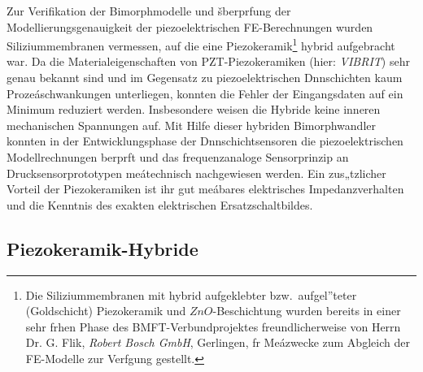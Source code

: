 Zur Verifikation der Bimorphmodelle und šberprfung der
Modellierungsgenauigkeit der piezoelektrischen FE-Berechnungen wurden
Siliziummembranen vermessen, auf die eine
Piezokeramik\footnote{Die Siliziummembranen mit hybrid aufgeklebter
bzw.\ aufgel”teter (Goldschicht) Piezokeramik und
$ZnO$-Beschichtung wurden bereits in einer sehr frhen
Phase des BMFT-Verbundprojektes freundlicherweise von Herrn Dr. G. Flik,
{\sl Robert Bosch GmbH}, Gerlingen, fr Meázwecke zum Abgleich der
FE-Modelle zur Verfgung gestellt.} hybrid aufgebracht war. Da die
Materialeigenschaften von PZT-Piezokeramiken (hier: {\sl VIBRIT}) sehr
genau bekannt sind und im Gegensatz zu piezoelektrischen Dnnschichten
kaum Prozeáschwankungen unterliegen, konnten die Fehler der
Eingangsdaten auf ein Minimum reduziert werden. Insbesondere weisen die
Hybride keine inneren mechanischen Spannungen auf. Mit Hilfe dieser
hybriden Bimorphwandler konnten in der Entwicklungsphase der
Dnnschichtsensoren die piezoelektrischen Modellrechnungen berprft und
das frequenzanaloge Sensorprinzip an Drucksensorprototypen meátechnisch
nachgewiesen werden. Ein zus„tzlicher Vorteil der Piezokeramiken ist ihr
gut meábares elektrisches Impedanzverhalten und die Kenntnis des exakten
elektrischen Ersatzschaltbildes.\\


\subsection{Piezokeramik-Hybride}
\label{hybride}

